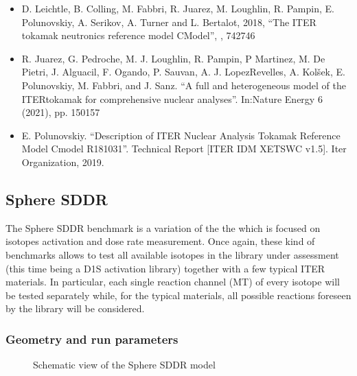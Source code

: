 \documentclass[letterpaper,10pt,english]{sphinxmanual}
\let\sphinxpxdimen\pdfpxdimen\else\newdimen\sphinxpxdimen
\begin{document}
\begin{itemize}
\item {} 
D. Leichtle, B. Colling, M. Fabbri, R. Juarez, M. Loughlin,
R. Pampin, E. Polunovskiy, A. Serikov, A. Turner and L. Bertalot, 2018,
“The ITER tokamak neutronics reference model C\sphinxhyphen{}Model”,
,  742\sphinxhyphen{}746

\item {} 
R. Juarez, G. Pedroche, M. J. Loughlin, R. Pampin, P Martinez, M. De Pietri,
J. Alguacil, F. Ogando, P. Sauvan, A. J. Lopez\sphinxhyphen{}Revelles, A. Kolšek,
E. Pol\sphinxhyphen{}unovskiy, M. Fabbri, and J. Sanz. “A full and heterogeneous model of
the ITERtokamak for comprehensive nuclear analyses”.
In:Nature Energy 6 (2021), pp. 150\textendash{}157

\item {} 
E. Polunovskiy. “Description of ITER Nuclear Analysis Tokamak Reference Model
C\sphinxhyphen{}model R181031”. Technical Report {[}ITER IDM XETSWC v1.5{]}. Iter Organization, 2019.

\end{itemize}




\subsection{Sphere SDDR}
\label{\detokenize{usage/benchmarks:sphere-sddr}}
The Sphere SDDR benchmark is a variation of the the {\hyperref[\detokenize{usage/benchmarks:spheredesc}]{}}
which is focused on isotopes activation and dose rate measurement.
Once again, these kind of benchmarks allows to test all available
isotopes in the library under assessment (this time being a D1S activation
library) together with a few typical ITER materials. In particular, each
single reaction channel (MT) of every isotope will be tested separately while,
for the typical materials, all possible reactions foreseen by the library will
be considered.


\subsubsection{Geometry and run parameters}
\label{\detokenize{usage/benchmarks:id7}}
\begin{figure}[htbp]
\centering
\capstart

\noindent\sphinxincludegraphics[width=600\sphinxpxdimen]{{sphereSDDRgeom}.png}
\caption{Schematic view of the Sphere SDDR model}\label{\detokenize{usage/benchmarks:id26}}\end{figure}
\end{document}
